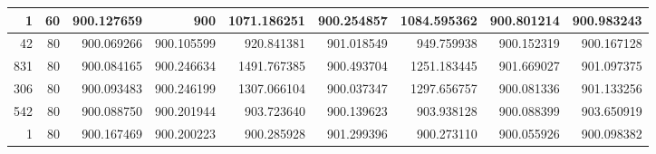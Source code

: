 \begin{table*}
\begin{tabular}{rrrrrrrrr}
     1        &    60  & 900.127659 &   900    & 1071.186251 & 900.254857 & 1084.595362 &  900.801214 & 900.983243 \\\midrule
    42       &     80 & 900.069266&  900.105599 &  920.841381  &901.018549 &  949.759938 & 900.152319 & 900.167128\\
    831      &      80 & 900.084165 & 900.246634 & 1491.767385 & 900.493704  &1251.183445 & 901.669027 &901.097375\\
    306     &       80 & 900.093483 & 900.246199 & 1307.066104 & 900.037347&  1297.656757 & 900.081336 & 901.133256\\
    542      &      80 & 900.088750&  900.201944 &  903.723640 & 900.139623 &  903.938128 & 900.088399 & 903.650919\\
    1        &    80&  900.167469 & 900.200223  & 900.285928 & 901.299396 &  900.273110 & 900.055926 & 900.098382\\
     \bottomrule
    \end{tabular}
\end{table*}
